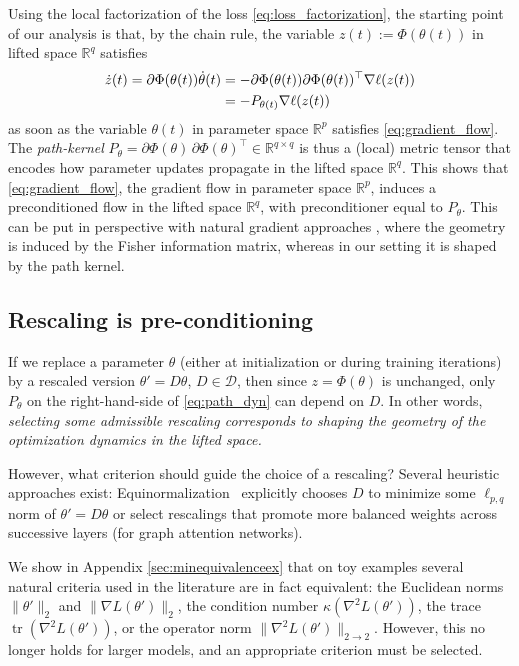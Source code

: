 \documentclass{article}
\theoremstyle{plain}
\theoremstyle{definition}
\theoremstyle{remark}
\def\Dcal{\mathcal{D}}
\def\tr{{\operatorname{tr}}}
\def\R{{\mathbb{R}}}
\def\Dcal{{\mathcal{D}}}
\begin{document}
{Using the local factorization of the loss \eqref{eq:loss_factorization},
the starting point of our analysis is that,
by the chain rule, the variable $z(t) := \Phi(\theta(t))$ in lifted space $\R^{q}$ satisfies
\begin{align}
    \dot z(t) =  \partial \Phi(\theta(t)) \dot \theta(t)
    &= - \partial \Phi(\theta(t)) \partial \Phi(\theta(t))^\top \nabla \ell(z(t))\notag\\
    & = -P_{\theta(t)} \nabla \ell(z(t))  \label{eq:path_dyn}
\end{align}
as soon as the variable $\theta(t)$ in parameter space $\R^{p}$ satisfies \eqref{eq:gradient_flow}.
The {\em path-kernel}  $P_{\theta} = \partial \Phi(\theta)\, \partial \Phi(\theta)^\top \in \R^{q \times q}$
\citep{gebhart2021unified, marcotte2025intrinsic} is thus a (local) metric tensor that encodes how parameter updates propagate in the lifted space $\R^{q}$.
This shows that \eqref{eq:gradient_flow}, the gradient flow in parameter space $\R^{p}$, induces a preconditioned flow in the lifted space $\R^{q}$,
with preconditioner equal to $P_{\theta}$.
This can be put in perspective with natural gradient approaches \citep{amari1998natural, martens}, where the geometry is induced by the Fisher information matrix,
whereas in our setting it is shaped by the path kernel.

\subsection{Rescaling is pre-conditioning}
If we replace a parameter $\theta$ (either at initialization or during training iterations) by a rescaled version $\theta' = D\theta$, $D \in \Dcal$, then
since $z = \Phi(\theta)$ is unchanged, only $P_{\theta}$ on the right-hand-side of  \eqref{eq:path_dyn} can depend on $D$.
In other words, {\em selecting some admissible rescaling corresponds to  shaping the geometry of the optimization dynamics in the lifted space. }

However, what criterion should guide the choice of a rescaling? Several heuristic approaches exist: Equinormalization~\citep{stock2019equinormalizationneuralnetworks,saul2023weightbalancing}
explicitly chooses $D$ to minimize some $\ell_{p,q}$ norm of $\theta'=D\theta$ or
\citet{mustafa2024dynamic} select rescalings that promote more balanced weights across successive layers (for graph attention networks).

  We  show in Appendix \ref{sec:minequivalenceex} that on toy examples several natural criteria used in the literature are 
  in fact equivalent: the Euclidean norms  $\|\theta'\|_{2}$ and $\|\nabla L(\theta')\|_{2}$, 
  the condition number $\kappa(\nabla^{2} L(\theta'))$, the trace $\tr(\nabla^{2} L(\theta'))$, or the operator norm
  $\|\nabla^{2} L(\theta')\|_{2 \to 2}$. 
  However, this no longer holds for larger models, and an appropriate criterion must be selected.


}
\end{document}
